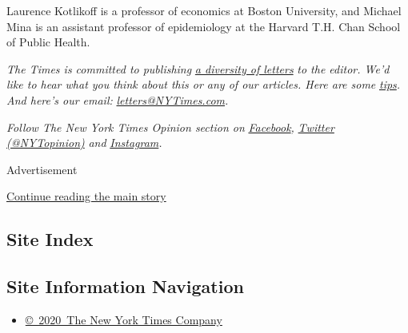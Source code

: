 Laurence Kotlikoff is a professor of economics at Boston University, and
Michael Mina is an assistant professor of epidemiology at the Harvard
T.H. Chan School of Public Health.

\emph{The Times is committed to publishing}
\href{https://www.nytimes3xbfgragh.onion/2019/01/31/opinion/letters/letters-to-editor-new-york-times-women.html}{\emph{a
diversity of letters}} \emph{to the editor. We'd like to hear what you
think about this or any of our articles. Here are some}
\href{https://help.nytimes3xbfgragh.onion/hc/en-us/articles/115014925288-How-to-submit-a-letter-to-the-editor}{\emph{tips}}\emph{.
And here's our email:}
\href{mailto:letters@NYTimes.com}{\emph{letters@NYTimes.com}}\emph{.}

\emph{Follow The New York Times Opinion section on}
\href{https://www.facebookcorewwwi.onion/nytopinion}{\emph{Facebook}}\emph{,}
\href{http://twitter.com/NYTOpinion}{\emph{Twitter (@NYTopinion)}}
\emph{and}
\href{https://www.instagram.com/nytopinion/}{\emph{Instagram}}\emph{.}

Advertisement

\protect\hyperlink{after-bottom}{Continue reading the main story}

\hypertarget{site-index}{%
\subsection{Site Index}\label{site-index}}

\hypertarget{site-information-navigation}{%
\subsection{Site Information
Navigation}\label{site-information-navigation}}

\begin{itemize}
\tightlist
\item
  \href{https://help.nytimes3xbfgragh.onion/hc/en-us/articles/115014792127-Copyright-notice}{©~2020~The
  New York Times Company}
\end{itemize}

